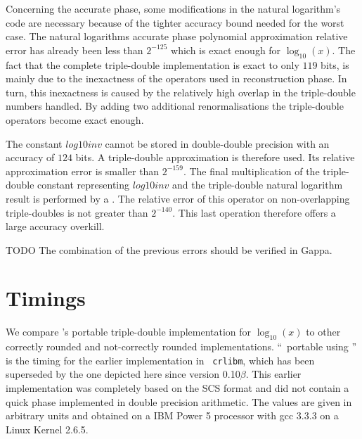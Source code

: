 Concerning the accurate phase, some modifications in the natural
logarithm's code are necessary because of the tighter accuracy bound
needed for the worst case. The natural logarithms accurate phase
polynomial approximation relative error has already been less than
$2^{-125}$ which is exact enough for $\log_{10}\left( x
\right)$. The fact that the complete triple-double implementation is
exact to only $119$ bits, is mainly due to the inexactness of the
operators used in reconstruction phase. In turn, this inexactness is
caused by the relatively high overlap in the triple-double numbers
handled. By adding two additional renormalisations the triple-double
operators become exact enough.

The constant $\mathit{log10inv}$ cannot be stored in double-double
precision with an accuracy of $124$ bits. A triple-double
approximation is therefore used. Its relative approximation error is
smaller than $2^{-159}$. The final multiplication of the triple-double
constant representing $\mathit{log10inv}$ and the triple-double
natural logarithm result is performed by a \MulTT. The relative error
of this operator on non-overlapping triple-doubles is not greater than
$2^{-140}$. This last operation therefore offers a large accuracy
overkill.

TODO The combination of the previous errors should be verified in Gappa.


\section{Timings}\label{subsec:timingslog10}

We compare \crlibm's portable triple-double implementation
for $\log_{10}\left( x \right)$ to other correctly rounded and
not-correctly rounded implementations.  ``\crlibm\ portable using
\scslib'' is the timing for the earlier implementation in {\tt
  crlibm}, which has been superseded by the one depicted here since
version 0.10$\beta$. This earlier implementation was completely based
on the SCS format and did not contain a quick phase implemented in
double precision arithmetic. The values are given in arbitrary units
and obtained on a IBM Power 5 processor with gcc 3.3.3 on a Linux
Kernel 2.6.5.
 
